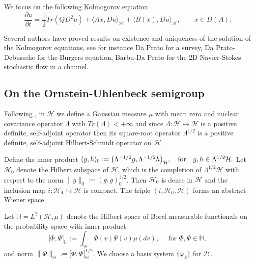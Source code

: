 \documentclass[]{interact}
\theoremstyle{plain}%
\theoremstyle{definition}
\theoremstyle{remark}
\begin{document}
    We focus on the following Kolmogorov equation
    \begin{equation}
        \label{P1s2.3}
        \frac{\partial u}{\partial t}
            = \frac{1}{2} Tr(QD^2u)
            + \langle Ax, Du
                \rangle_\mathcal{H} 
            + \langle B(x),Du \rangle_\mathcal{H},
            \qquad x\in D(A).
    \end{equation}

        Several authors have proved results on existence and uniqueness of the
    solution of the Kolmogorov equations, see for instance Da Prato \cite{da} 
    for a survey, Da Prato-Debussche \cite{da-de} for the Burgers equation,  
    Barbu-Da Prato \cite{ba-da} for the 2D Navier-Stokes stochastic flow in a 
    channel.
%
    \subsection{On the Ornstein-Uhlenbeck semigroup}
        \label{OUS-sect}
        Following \cite{liu},  in $\mathcal{H}$ we define a Gaussian measure 
        $\mu$ with mean zero and nuclear covariance operator $\Lambda$ with
        ${Tr(\Lambda)<+\infty}$ and since 
        $
            \Lambda:\mathcal{H}\mapsto \mathcal{H}
        $ 
    is a positive definite, self-adjoint operator then its square-root operator
    $\Lambda^{1/2}$ is a positive definite, self-adjoint Hilbert-Schmidt 
    operator on $\mathcal{H}$.

        Define the inner product
    $
        ( g, h )_0 := 
        \big( 
            \Lambda^{-1/2}g ,
            \Lambda^{-1/2} h
        \big)_\mathcal{H},
        \quad 
        \hbox{\rm for}
        \quad g, h \in 
        \Lambda^{1/2} 
        \mathcal{H}.
    $
    Let $\mathcal{H}_0$ denote the Hilbert subspace of $\mathcal{H}$, which is 
    the completion of $\Lambda^{1/2} \mathcal{H}$ with respect to the norm
    $\|g\|_0:= ( g, g )_0^{1/2} $. Then ${\mathcal{H}_0}$ is
    dense in $\mathcal{H}$ and the inclusion map
    $i:\mathcal{H}_0\hookrightarrow\mathcal{H}$ is compact. The triple
    $(i,\mathcal{H}_0,\mathcal{H})$ forms an abstract Wiener space.

    Let
    $
        \mathbb{H} = L^2 (\mathcal{H}, \mu)
    $
    denote the Hilbert space of Borel
    measurable functionals on the probability space with inner
    product
    \[
        \big[ 
            \Phi,
            \Psi
        \big]_\mathbb{H}
        :=
            \int_{\mathcal{H}} 
            \Phi(v)
            \Psi(v)\mu(dv),\quad
            \text{ for } 
            \Phi,\Psi\in\mathbb{H},
    \]
    and norm 
    $\|\Phi\|_{\mathbb{H}}:=\big [\Phi,\Phi\big ]_\mathbb{H}^{1/2}$.
    We choose a basis system $\{\varphi_k\}$ for $\mathcal{H}$.
\end{document}
